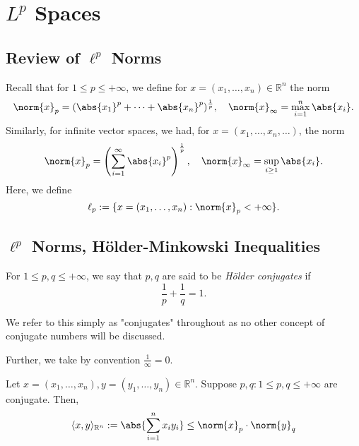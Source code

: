 \section{\texorpdfstring{$L^p$ Spaces}{Lp Spaces}}

\subsection{Review of \texorpdfstring{$\ell^p$ Norms}{lp Norms}}

\begin{remark}
    Recall that for $1 \leq p \leq + \infty$, we define for $x = (x_1, \dots, x_n) \in \mathbb{R}^n$ the norm \[
    \norm{x}_p = (\abs{x_1}^p + \cdots + \abs{x_n}^p)^{\frac{1}{p}}, \quad \norm{x}_{\infty} = \max_{i=1}^{n} \abs{x_i}.
    \]
    Similarly, for infinite vector spaces, we had, for $x = (x_1, \dots, x_n, \dots)$, the norm \[
    \norm{x}_p = \left(\sum_{i=1}^\infty\abs{x_i}^p\right)^{\frac{1}{p}}, \quad \norm{x}_\infty = \sup_{i \geq 1} \abs{x_i}.
    \]
    Here, we define \[
        \ell_p := \{x = (x_1, \dots, x_n) : \norm{x}_p < + \infty\}.
    \]
\end{remark}

\subsection{\texorpdfstring{$\ell^p$ Norms}{lp Norms}, Hölder-Minkowski Inequalities}

\begin{definition}
    For $1 \leq p, q \leq + \infty$, we say that $p, q$ are said to be \emph{Hölder conjugates} if \[
    \frac{1}{p} + \frac{1}{q} = 1.    
    \]
\end{definition}

\begin{remark}
    We refer to this simply as "conjugates" throughout as no other concept of conjugate numbers will be discussed.

    Further, we take by convention $\frac{1}{\infty} = 0$.
\end{remark}

\begin{proposition}\label{prop:holdersinequality}
    Let $x = (x_1, \dots, x_n), y = (y_1, \dots, y_n) \in \mathbb{R}^n$. Suppose $p, q : 1 \leq p, q \leq + \infty$ are conjugate. Then, \[
   \langle x, y \rangle_{\mathbb{R}^n} := \abs{\sum_{i=1}^n x_i y_i} \leq \norm{x}_p \cdot \norm{y}_q
    \]
\end{proposition}

